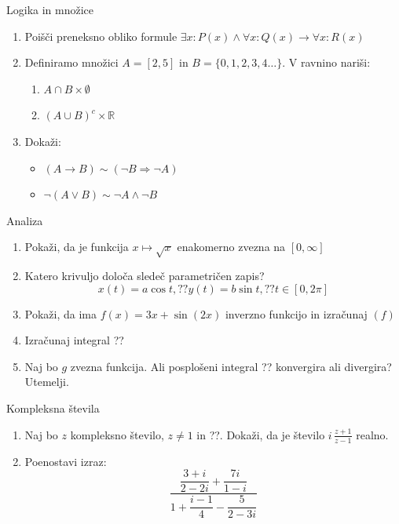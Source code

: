 \begin{frame}{Logika in množice}
	\begin{enumerate}
		\item
		Poišči preneksno obliko formule
		$\exists x : P(x) \land \forall x : Q(x) \rightarrow \forall x : R(x)$
		\item 
		Definiramo množici $A=[2,5]$ in $B=\{0,1,2,3,4\ldots\}$.
		V ravnino nariši:
		\begin{enumerate}
		   \item $A \cap B \times \emptyset$
		   \item $(A\cup B)^c \times \mathbb{R}$
		\end{enumerate}
		\item
		Dokaži:
		\begin{itemize}
			\item $(A \rightarrow B) \sim (\lnot B \Rightarrow \lnot A)$
			\item $\lnot (A \lor B) \sim \lnot A \land \lnot B$
		\end{itemize}
	\end{enumerate}
\end{frame}

\begin{frame}{Analiza}
	\begin{enumerate}
		\item
		Pokaži, da je funkcija $x \mapsto \sqrt{x}$ enakomerno zvezna na $ [0, \infty]$
		\item 
		Katero krivuljo določa sledeč parametričen zapis?
		$$
		   x(t) = a \cos t, ?? %
		   y(t) = b \sin t, ?? %
		   t \in [0, 2 \pi]
		$$ 
		\item
		Pokaži, da ima $f(x)=3x+\sin(2x)$ inverzno funkcijo in izračunaj $(f)$
		
		\item
		Izračunaj integral 
		??
		\item 
		Naj bo $g$ zvezna funkcija. Ali posplošeni integral 
		??
		konvergira ali divergira? Utemelji.
	\end{enumerate}
\end{frame}

\begin{frame}{Kompleksna števila}
	\begin{enumerate}
		\item
		Naj bo $z$ kompleksno število, $z \ne 1$ in ??.
		Dokaži, da je število \( i \, \frac{z+1}{z-1} \) realno.
		\item
		Poenostavi izraz:
		$$
		\frac{\dfrac{3+i}{2-2i} + \dfrac{7i}{1-i}}{1 + \dfrac{i-1}{4} - \dfrac{5}{2-3i}}
		$$
	\end{enumerate}
\end{frame}